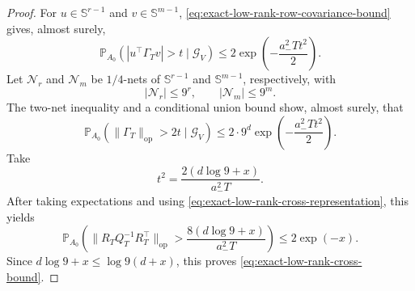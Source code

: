 \documentclass[10pt,a4paper]{amsart}
\begin{document}
\begin{proof}
For $u\in\mathbb S^{r-1}$ and $v\in\mathbb S^{m-1}$,
\eqref{eq:exact-low-rank-row-covariance-bound} gives, almost surely,
\[
    \mathbb P_{A_0}\!\left(
        |u^\top \Gamma_Tv|>t\mid\mathcal G_V
    \right)
    \leq2\exp\!\left(-\frac{a_-^2Tt^2}{2}\right).
\]
Let $\mathcal N_r$ and $\mathcal N_m$ be $1/4$-nets of
$\mathbb S^{r-1}$ and $\mathbb S^{m-1}$, respectively, with
\[
    |\mathcal N_r|\leq9^r,
    \qquad
    |\mathcal N_m|\leq9^m.
\]
The two-net inequality and a conditional union bound show, almost surely, that
\[
    \mathbb P_{A_0}\!\left(
        \|\Gamma_T\|_{\mathrm{op}}>2t\mid\mathcal G_V
    \right)
    \leq2\cdot9^d\exp\!\left(-\frac{a_-^2Tt^2}{2}\right).
\]
Take
\[
    t^2=\frac{2(d\log9+x)}{a_-^2T}.
\]
After taking expectations and using \eqref{eq:exact-low-rank-cross-representation},
this yields
\[
    \mathbb P_{A_0}\!\left(
        \|R_TQ_T^{-1}R_T^\top\|_{\mathrm{op}}
        >\frac{8(d\log9+x)}{a_-^2T}
    \right)
    \leq2\exp(-x).
\]
Since $d\log9+x\leq\log9(d+x)$, this proves
\eqref{eq:exact-low-rank-cross-bound}.
\end{proof}
\end{document}
